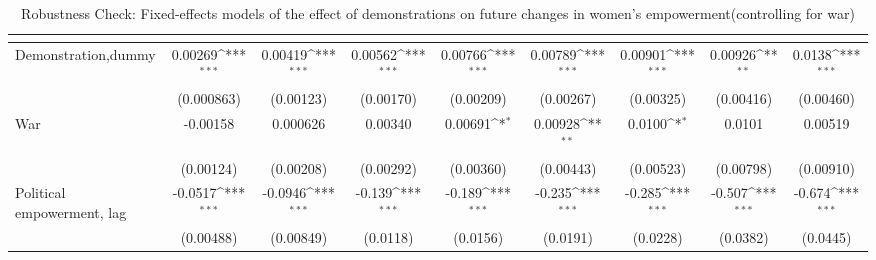 \begin{table}[htbp]\centering
\def\sym#1{\ifmmode^{#1}\else\(^{#1}\)\fi}
\caption{Robustness Check: Fixed-effects models of the effect of demonstrations on future changes in women's empowerment(controlling for war) \label{polemdemonstrationwar}}
\begin{tabular}{l*{8}{c}}
\hline\hline
                    &&&&&&&&\\
\hline
Demonstration,dummy&     0.00269\sym{***}&     0.00419\sym{***}&     0.00562\sym{***}&     0.00766\sym{***}&     0.00789\sym{***}&     0.00901\sym{***}&     0.00926\sym{**} &      0.0138\sym{***}\\
                    &  (0.000863)         &   (0.00123)         &   (0.00170)         &   (0.00209)         &   (0.00267)         &   (0.00325)         &   (0.00416)         &   (0.00460)         \\
[1em]
War           &    -0.00158         &    0.000626         &     0.00340         &     0.00691\sym{*}  &     0.00928\sym{**} &      0.0100\sym{*}  &      0.0101         &     0.00519         \\
                    &   (0.00124)         &   (0.00208)         &   (0.00292)         &   (0.00360)         &   (0.00443)         &   (0.00523)         &   (0.00798)         &   (0.00910)         \\
[1em]
Political empowerment, lag   &     -0.0517\sym{***}&     -0.0946\sym{***}&      -0.139\sym{***}&      -0.189\sym{***}&      -0.235\sym{***}&      -0.285\sym{***}&      -0.507\sym{***}&      -0.674\sym{***}\\
                    &   (0.00488)         &   (0.00849)         &    (0.0118)         &    (0.0156)         &    (0.0191)         &    (0.0228)         &    (0.0382)         &    (0.0445)         \\

\end{tabular}
\end{table}

